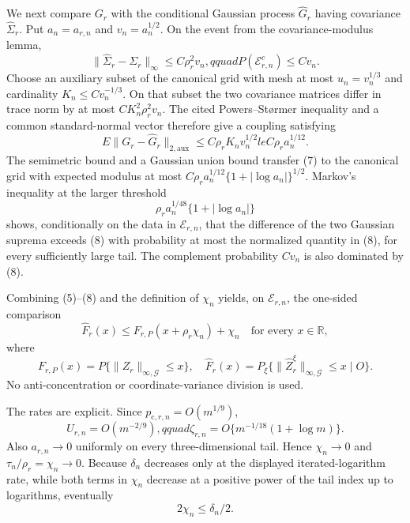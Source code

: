 We next compare \(G_r\) with the conditional Gaussian process \(\widehat G_r\) having covariance \(\widehat\Sigma_r\). Put \(a_n=a_{r,n}\) and \(v_n=a_n^{1/2}\). On the event from the covariance-modulus lemma,
\[
 \|\widehat\Sigma_r-\Sigma_r\|_\infty
 \le C\rho_r^2v_n,qquad
 P(\mathcal E_{r,n}^c)\le Cv_n.                           \tag{6}
\]
Choose an auxiliary subset of the canonical grid with mesh at most \(u_n=v_n^{1/3}\) and cardinality \(K_n\le Cv_n^{-1/3}\). On that subset the two covariance matrices differ in trace norm by at most \(CK_n^2\rho_r^2v_n\). The cited Powers--St\o rmer inequality and a common standard-normal vector therefore give a coupling satisfying
\[
 E\|G_r-\widehat G_r\|_{2,\mathrm{aux}}
 \le C\rho_rK_nv_n^{1/2}le C\rho_r a_n^{1/12}.          \tag{7}
\]
The semimetric bound and a Gaussian union bound transfer (7) to the canonical grid with expected modulus at most
\(C\rho_r a_n^{1/12}\{1+|\log a_n|\}^{1/2}\). Markov's inequality at the larger threshold
\[
 \rho_r a_n^{1/48}\{1+|\log a_n|\}                      \tag{8}
\]
shows, conditionally on the data in \(\mathcal E_{r,n}\), that the difference of the two Gaussian suprema exceeds (8) with probability at most the normalized quantity in (8), for every sufficiently large tail. The complement probability \(Cv_n\) is also dominated by (8).

Combining (5)--(8) and the definition of \(\chi_n\) yields, on \(\mathcal E_{r,n}\), the one-sided comparison
\[
 \widehat F_r(x)
 \le F_{r,P}(x+\rho_r\chi_n)+\chi_n
 \quad\text{for every }x\in\mathbb R,                    \tag{9}
\]
where
\[
 F_{r,P}(x)=P\{\|Z_r\|_{\infty,\mathcal G}\le x\},
 \quad
 \widehat F_r(x)=P_\xi\{\|\widehat Z_r^\xi\|_{\infty,\mathcal G}\le x\mid O\}.
\]
No anti-concentration or coordinate-variance division is used.

The rates are explicit. Since \(p_{\mathrm c,r,n}=O(m^{1/9})\),
\[
 U_{r,n}=O(m^{-2/9}),qquad
 \zeta_{r,n}=O\{m^{-1/18}(1+\log m)\}.                   \tag{10}
\]
Also \(a_{r,n}\to0\) uniformly on every three-dimensional tail. Hence \(\chi_n\to0\) and \(\tau_n/\rho_r=\chi_n\to0\). Because \(\delta_n\) decreases only at the displayed iterated-logarithm rate, while both terms in \(\chi_n\) decrease at a positive power of the tail index up to logarithms, eventually
\[
 2\chi_n\le\delta_n/2.                                    \tag{11}
\]

